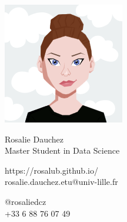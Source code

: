 \documentclass{article}
\begin{document}
\centering \includegraphics[width=.2\linewidth]{AvatarMaker}\\[5pt]
\parbox{2in}{\Large \centering Rosalie Dauchez\\[1pt]
\normalsize Master Student in Data Science}

\vfill
\raggedright
\begin{multicols}{2}
https://rosalub.github.io/\\
rosalie.dauchez.etu@univ-lille.fr

\columnbreak
\raggedleft
@rosaliedcz\\
+33 6 88 76 07 49%
\end{multicols}%
\end{document}
